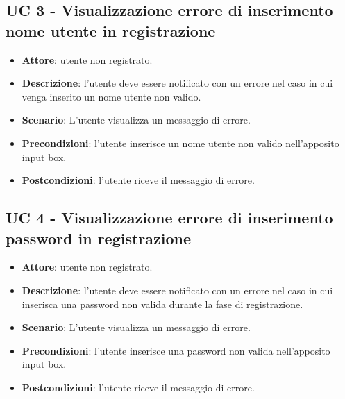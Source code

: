 \subsection{UC 3 - Visualizzazione errore di inserimento nome utente in registrazione}
\begin{itemize}
    \item \textbf{Attore}: utente non registrato.
    \item \textbf{Descrizione}: l’utente deve essere notificato con un errore nel caso in cui venga inserito un nome utente non valido.
    \item \textbf{Scenario}: L’utente visualizza un messaggio di errore.
    \item \textbf{Precondizioni}: l’utente inserisce un nome utente non valido nell'apposito input box.
    \item \textbf{Postcondizioni}: l’utente riceve il messaggio di errore.
\end{itemize}

\subsection{UC 4 - Visualizzazione errore di inserimento password in registrazione}
\begin{itemize}
    \item \textbf{Attore}: utente non registrato.
    \item \textbf{Descrizione}: l’utente deve essere notificato con un errore nel caso in cui inserisca una password non valida durante la fase di registrazione.
    \item \textbf{Scenario}: L’utente visualizza un messaggio di errore.
    \item \textbf{Precondizioni}: l’utente inserisce una password non valida nell'apposito input box.
    \item \textbf{Postcondizioni}: l’utente riceve il messaggio di errore.
\end{itemize}

